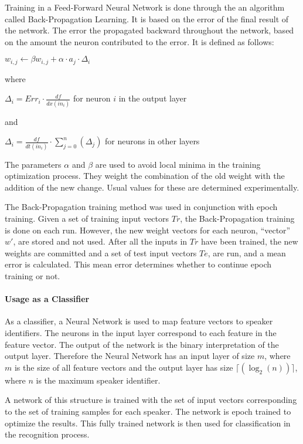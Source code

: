 Training in a Feed-Forward Neural Network is done through the an
algorithm called Back-Propagation Learning. It is based on the error
of the final result of the network. The error the propagated backward
throughout the network, based on the amount the neuron contributed to
the error. It is defined as follows:

$w_{i,j} \longleftarrow \beta w_{i,j} + \alpha \cdot a_{j} \cdot \Delta_{i}$

where

$\Delta_{i} = Err_{i} \cdot \frac{df}{dx(in_{i})}$  for neuron $i$ in the output layer

and

$\Delta_{i} = \frac{df}{dt(in_{i})} \cdot \displaystyle\sum_{j=0}^{n}(\Delta_{j})$ for neurons in other layers

The parameters $\alpha$ and $\beta$ are used to avoid local minima in
the training optimization process. They weight the combination of the
old weight with the addition of the new change. Usual values for these
are determined experimentally.

The Back-Propagation training method was used in conjunction with
epoch training. Given a set of training input vectors $Tr$, the
Back-Propagation training is done on each run. However, the new weight
vectors for each neuron, ``vector'' $w'$, are stored and not used. After
all the inputs in $Tr$ have been trained, the new weights are committed
and a set of test input vectors $Te$, are run, and a mean error is
calculated. This mean error determines whether to continue epoch
training or not.

\paragraph{Usage as a Classifier}

As a classifier, a Neural Network is used to map feature vectors to
speaker identifiers. The neurons in the input layer correspond to each
feature in the feature vector. The output of the network is the binary
interpretation of the output layer. Therefore the Neural Network has
an input layer of size $m$, where $m$ is the size of all feature vectors
and the output layer has size $\lceil(\log_{2}(n))\rceil$, where $n$ is the maximum
speaker identifier.

A network of this structure is trained with the set of input vectors
corresponding to the set of training samples for each speaker. The
network is epoch trained to optimize the results. This fully trained
network is then used for classification in the recognition process.
